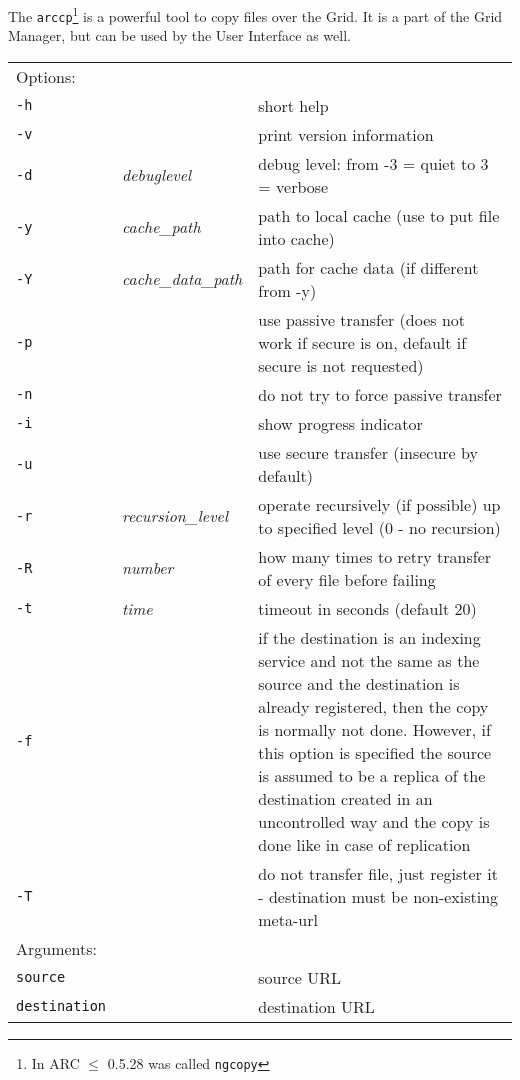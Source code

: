 The \texttt{arccp}\footnote{In ARC $\leq$ 0.5.28 was called
  \texttt{ngcopy}}  is a powerful
tool to copy files over the Grid. It is a part of the Grid Manager,
but can be used by the User Interface as well.
\hspace*{0.5cm}
\begin{shaded}
\end{shaded}
\begin{longtable}{llp{8cm}}
    Options:&&\\
    \texttt{-h} && short help\\
    \texttt{-v} && print version information\\
    \texttt{-d} & \textit{debuglevel} &debug level: from -3 = quiet to 3 = verbose\\
    \texttt{-y} & \textit{cache\_path} & path to local cache (use to put file into cache)\\
    \texttt{-Y} & \textit{cache\_data\_path} & path for cache data (if different from -y)\\
    \texttt{-p} && use passive transfer (does not work if secure is on, default if secure is not requested)\\
    \texttt{-n} && do not try to force passive transfer\\
    \texttt{-i} && show progress indicator\\
    \texttt{-u} && use secure transfer (insecure by default)\\
    \texttt{-r} & \textit{recursion\_level} & operate recursively (if possible) up to specified level (0 - no recursion)\\
    \texttt{-R} & \textit{number} & how many times to retry transfer of every file before failing\\
    \texttt{-t} & \textit{time} & timeout in seconds (default 20)\\
    \texttt{-f} && if the destination is an indexing service and not the same as the source and the destination is already registered, then the copy is normally not done. However, if this option is specified the source is assumed to be a replica of the destination created in an uncontrolled way and the copy is done like in case of replication\\
    \texttt{-T} && do not transfer file, just register it - destination must be non-existing meta-url\\
    Arguments:&&\\
    \texttt{source} && source URL\\
    \texttt{destination} && destination URL\\
\end{longtable}

